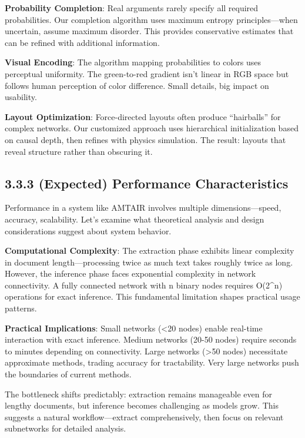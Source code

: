\documentclass[
  11pt,
  letterpaper,
  openany]{book}
\begin{document}
\textbf{Probability Completion}: Real arguments rarely specify all
required probabilities. Our completion algorithm uses maximum entropy
principles---when uncertain, assume maximum disorder. This provides
conservative estimates that can be refined with additional information.

\textbf{Visual Encoding}: The algorithm mapping probabilities to colors
uses perceptual uniformity. The green-to-red gradient isn't linear in
RGB space but follows human perception of color difference. Small
details, big impact on usability.

\textbf{Layout Optimization}: Force-directed layouts often produce
``hairballs'' for complex networks. Our customized approach uses
hierarchical initialization based on causal depth, then refines with
physics simulation. The result: layouts that reveal structure rather
than obscuring it.

\subsection{3.3.3 (Expected) Performance
Characteristics}\label{sec-performance}

Performance in a system like AMTAIR involves multiple
dimensions---speed, accuracy, scalability. Let's examine what
theoretical analysis and design considerations suggest about system
behavior.

\textbf{Computational Complexity}: The extraction phase exhibits linear
complexity in document length---processing twice as much text takes
roughly twice as long. However, the inference phase faces exponential
complexity in network connectivity. A fully connected network with n
binary nodes requires O(2\^{}n) operations for exact inference. This
fundamental limitation shapes practical usage patterns.

\textbf{Practical Implications}: Small networks (\textless20 nodes)
enable real-time interaction with exact inference. Medium networks
(20-50 nodes) require seconds to minutes depending on connectivity.
Large networks (\textgreater50 nodes) necessitate approximate methods,
trading accuracy for tractability. Very large networks push the
boundaries of current methods.

The bottleneck shifts predictably: extraction remains manageable even
for lengthy documents, but inference becomes challenging as models grow.
This suggests a natural workflow---extract comprehensively, then focus
on relevant subnetworks for detailed analysis.
\end{document}
